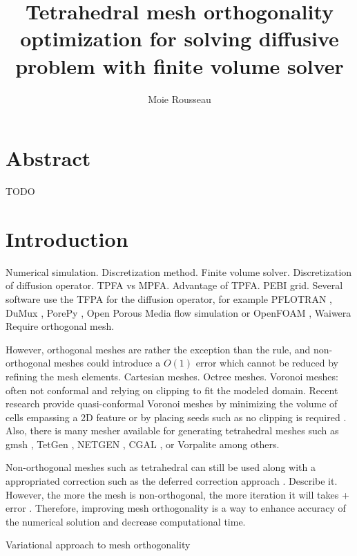 \documentclass[11pt]{article}
\title{\textbf{Tetrahedral mesh orthogonality optimization for solving diffusive problem with finite volume solver}}
\author{Moie Rousseau}
\date{}
\begin{document}
\maketitle
\thispagestyle{empty}

\section*{Abstract}

TODO

\section{Introduction}

Numerical simulation. 
Discretization method. 
Finite volume solver. 
Discretization of diffusion operator.
TPFA vs MPFA. Advantage of TPFA. PEBI grid.
Several software use the TFPA for the diffusion operator, for example PFLOTRAN \cite{hammond_pflotran_2012}, DuMux \cite{koch_dumux_2021}, PorePy \cite{keilegavlen_porepy_2021}, Open Porous Media flow simulation \cite{rasmussen_the_2021} or OpenFOAM \cite{}, Waiwera %
Require orthogonal mesh.

However, orthogonal meshes are rather the exception than the rule, and non-orthogonal meshes could introduce a $O(1)$ error which cannot be reduced by refining the mesh elements.
Cartesian meshes.
Octree meshes.
Voronoi meshes: often not conformal and relying on clipping to fit the modeled domain.
Recent research provide quasi-conformal Voronoi meshes by minimizing the volume of cells empassing a 2D feature \cite{merland_voronoi_2014} or by placing seeds such as no clipping is required \cite{abdelkader_vorocrust_2020}.
Also, there is many mesher available for generating tetrahedral meshes such as gmsh \cite{geuzaine_gmsh_2007}, TetGen \cite{si_tetgen_2015}, NETGEN \cite{schoberl_netgen_1997}, CGAL \cite{}, or Vorpalite \cite{} among others.

Non-orthogonal meshes such as tetrahedral can still be used along with a appropriated correction such as the deferred correction approach \cite{jasak_error_1996, moukalled_finite_2016}.
Describe it.
However, the more the mesh is non-orthogonal, the more iteration it will takes + error \cite{traore_robust_2009}. %
Therefore, improving mesh orthogonality is a way to enhance accuracy of the numerical solution and decrease computational time.

Variational approach to mesh orthogonality
\end{document}
